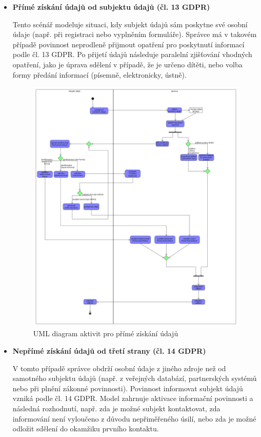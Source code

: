 \begin{itemize}
  \item \textbf{Přímé získání údajů od subjektu údajů (čl. 13 GDPR)}
  
  Tento scénář modeluje situaci, kdy subjekt údajů sám poskytne své osobní údaje (např. při registraci nebo vyplněním formuláře). Správce má v takovém případě povinnost neprodleně přijmout opatření pro poskytnutí informací podle čl. 13 GDPR. Po přijetí údajů následuje paralelní zjišťování vhodných opatření, jako je úprava sdělení v případě, že je určeno dítěti, nebo volba formy předání informací (písemně, elektronicky, ústně).

  \begin{figure}[H]
    \centering
    \includegraphics[width=\textwidth]{images/UML_activity_informace_primo.png}
    \caption{UML diagram aktivit pro přímé získání údajů}
    \label{fig:uml_activity_informace_primo}
  \end{figure}

  \item \textbf{Nepřímé získání údajů od třetí strany (čl. 14 GDPR)}

  V tomto případě správce obdrží osobní údaje z jiného zdroje než od samotného subjektu údajů (např. z veřejných databází, partnerských systémů nebo při plnění zákonné povinnosti). Povinnost informovat subjekt údajů vzniká podle čl. 14 GDPR. Model zahrnuje aktivace informační povinnosti a následná rozhodnutí, např. zda je možné subjekt kontaktovat, zda informování není vyloučeno z důvodu nepřiměřeného úsilí, nebo zda je možné odložit sdělení do okamžiku prvního kontaktu.


\end{itemize}

